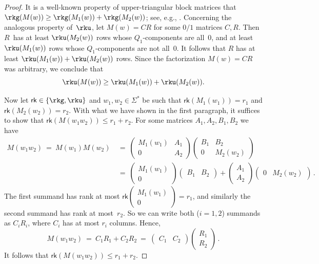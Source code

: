 \begin{proof}
It is a well-known property of upper-triangular block matrices that $\rkg(M(w)) \ge \rkg(M_1(w)) + \rkg(M_2(w))$; see, e.g., \cite[Chapter 0.9.4]{HornJohnson13}.
Concerning the analogous property of~$\rku$, let $M(w) = C R$ for some $0/1$ matrices $C, R$.
Then $R$~has at least $\rku(M_2(w))$ rows whose $Q_1$-components are all~$0$, and at least $\rku(M_1(w))$ rows whose $Q_1$-components are not all~$0$.
It follows that $R$ has at least $\rku(M_1(w)) + \rku(M_2(w))$ rows.
Since the factorization $M(w) = C R$ was arbitrary, we conclude that \[\rku(M(w)) \ge \rku(M_1(w)) + \rku(M_2(w)).\]

\newcommand{\myrank}{\mathsf{rk}}
Now let $\myrank \in \{\rkg, \rku\}$ and $w_1, w_2 \in \Sigma^*$ be such that $\myrank(M_1(w_1)) = r_1$ and $\myrank(M_2(w_2)) = r_2$.
With what we have shown in the first paragraph, it suffices to show that $\myrank(M(w_1 w_2)) \le r_1 + r_2$.
For some matrices $A_1, A_2, B_1, B_2$ we have
\begin{align*}
M(w_1 w_2) \ = \ M(w_1) M(w_2) \ &= \ 
\begin{pmatrix}
    M_1(w_1) & A_1 \\ 0 & A_2
\end{pmatrix}
\begin{pmatrix}
    B_1 & B_2 \\ 0 & M_2(w_2)
\end{pmatrix} \\
&= \ 
\begin{pmatrix}
    M_1(w_1) \\ 0 
\end{pmatrix}
\begin{pmatrix}
    B_1 & B_2 
\end{pmatrix}
+
\begin{pmatrix}
    A_1 \\ A_2
\end{pmatrix}
\begin{pmatrix}
   0 & M_2(w_2)
\end{pmatrix}\,.
\end{align*}
The first summand has rank at most $\myrank \begin{pmatrix}
    M_1(w_1) \\ 0 
\end{pmatrix} = r_1$, and similarly the second summand has rank at most~$r_2$.
So we can write both ($i=1,2$) summands as $C_i R_i$, where $C_i$ has at most $r_i$ columns.
Hence, 
\[
M(w_1 w_2) \ = \ C_1 R_1 + C_2 R_2 \ = \ 
\begin{pmatrix}
    C_1 & C_2 
\end{pmatrix}
\begin{pmatrix}
    R_1 \\ R_2
\end{pmatrix}\,.
\]
It follows that $\myrank(M(w_1 w_2)) \le r_1+r_2$.
\end{proof}

